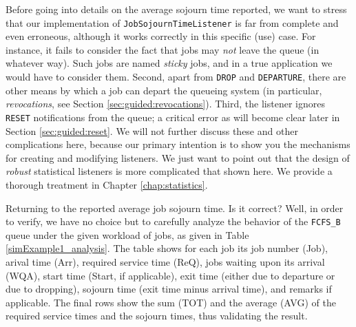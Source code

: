 \documentclass[12pt]{book}
\begin{document}
Before going into details on the average sojourn time reported,
  we want to stress that our implementation of
  \lstinline|JobSojournTimeListener| is far from complete and even erroneous,
  although it works correctly in this specific (use) case.
For instance, it fails to consider the fact that jobs may
  {\em not\/} leave the queue (in whatever way).
Such jobs are named {\em sticky\/} jobs,
  and in a true application we would have to consider them.
Second,
  apart from \lstinline|DROP| and \lstinline|DEPARTURE|,
  there are other means by which a job
  can depart the queueing system
  (in particular, {\em revocations},
   see Section \ref{sec:guided:revocations}).
Third,
  the listener ignores \lstinline|RESET|
  notifications from the queue; a critical error as will become
  clear later in Section \ref{sec:guided:reset}.
We will not further discuss these and other complications here,
  because our primary intention is to show you
  the mechanisms for creating and modifying listeners.
We just want to point out that the design of {\em robust\/}
  statistical listeners is more complicated that shown here.
We provide a thorough treatment in Chapter \ref{chap:statistics}.

Returning to the reported average job sojourn time.
Is it correct?
Well, in order to verify, we have no choice but to carefully analyze
  the behavior of the \lstinline|FCFS_B| queue under the given
  workload of jobs, as given in Table \ref{simExample1_analysis}.
The table shows for each job its
  job number (Job),
  arival time (Arr),
  required service time (ReQ),
  jobs waiting upon its arrival (WQA),
  start time (Start, if applicable),
  exit time (either due to departure or due to dropping),
  sojourn time (exit time minus arrival time),
  and remarks if applicable.
The final rows
  show the sum (TOT) and the average (AVG)
  of the required service times and
  the sojourn times,
  thus validating the result.
\end{document}
